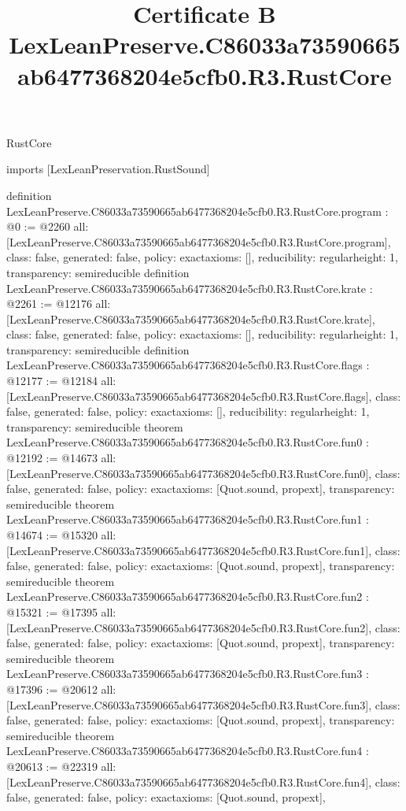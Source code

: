 \begin{lexlean}{RustCore}
\title{Certificate B LexLeanPreserve.C86033a73590665ab6477368204e5cfb0.R3.RustCore}
\begin{coremodule}
imports [LexLeanPreservation.RustSound]

definition LexLeanPreserve.C86033a73590665ab6477368204e5cfb0.R3.RustCore.program : @0 := @2260 {
  all: [LexLeanPreserve.C86033a73590665ab6477368204e5cfb0.R3.RustCore.program],
  class: false,
  generated: false,
  policy: exact{axioms: []},
  reducibility: regular{height: 1},
  transparency: semireducible
}
definition LexLeanPreserve.C86033a73590665ab6477368204e5cfb0.R3.RustCore.krate : @2261 := @12176 {
  all: [LexLeanPreserve.C86033a73590665ab6477368204e5cfb0.R3.RustCore.krate],
  class: false,
  generated: false,
  policy: exact{axioms: []},
  reducibility: regular{height: 1},
  transparency: semireducible
}
definition LexLeanPreserve.C86033a73590665ab6477368204e5cfb0.R3.RustCore.flags : @12177 := @12184 {
  all: [LexLeanPreserve.C86033a73590665ab6477368204e5cfb0.R3.RustCore.flags],
  class: false,
  generated: false,
  policy: exact{axioms: []},
  reducibility: regular{height: 1},
  transparency: semireducible
}
theorem LexLeanPreserve.C86033a73590665ab6477368204e5cfb0.R3.RustCore.fun0 : @12192 := @14673 {
  all: [LexLeanPreserve.C86033a73590665ab6477368204e5cfb0.R3.RustCore.fun0],
  class: false,
  generated: false,
  policy: exact{axioms: [Quot.sound, propext]},
  transparency: semireducible
}
theorem LexLeanPreserve.C86033a73590665ab6477368204e5cfb0.R3.RustCore.fun1 : @14674 := @15320 {
  all: [LexLeanPreserve.C86033a73590665ab6477368204e5cfb0.R3.RustCore.fun1],
  class: false,
  generated: false,
  policy: exact{axioms: [Quot.sound, propext]},
  transparency: semireducible
}
theorem LexLeanPreserve.C86033a73590665ab6477368204e5cfb0.R3.RustCore.fun2 : @15321 := @17395 {
  all: [LexLeanPreserve.C86033a73590665ab6477368204e5cfb0.R3.RustCore.fun2],
  class: false,
  generated: false,
  policy: exact{axioms: [Quot.sound, propext]},
  transparency: semireducible
}
theorem LexLeanPreserve.C86033a73590665ab6477368204e5cfb0.R3.RustCore.fun3 : @17396 := @20612 {
  all: [LexLeanPreserve.C86033a73590665ab6477368204e5cfb0.R3.RustCore.fun3],
  class: false,
  generated: false,
  policy: exact{axioms: [Quot.sound, propext]},
  transparency: semireducible
}
theorem LexLeanPreserve.C86033a73590665ab6477368204e5cfb0.R3.RustCore.fun4 : @20613 := @22319 {
  all: [LexLeanPreserve.C86033a73590665ab6477368204e5cfb0.R3.RustCore.fun4],
  class: false,
  generated: false,
  policy: exact{axioms: [Quot.sound, propext]},
}
\end{coremodule}
\end{lexlean}
